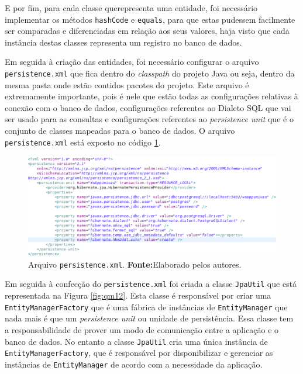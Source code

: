 		\par E por fim, para cada classe querepresenta uma 	entidade, foi necessário
	implementar os métodos \texttt{hashCode} e \texttt{equals}, para que estas
	pudessem facilmente ser comparadas e diferenciadas em relação aos seus
	valores, haja visto que cada instância destas classes representa um registro
	no banco de dados.
		
		\par Em seguida à criação das entidades, foi necessário configurar o arquivo
	\texttt{persistence.xml} que fica dentro do \textit{classpath} do projeto
	Java ou seja, dentro da mesma pasta onde estão contidos pacotes do
	projeto. Este arquivo é extremamente importante, pois é nele que estão todas
	as configurações relativas à conexão com o banco de dados, configurações
	referentes ao Dialeto SQL que vai ser usado para as consultas e configurações
	referentes ao \textit{persistence unit} que é o conjunto de classes mapeadas
	para o banco de dados.	O arquivo \texttt{persistence.xml} está exposto no
	código \ref{fig:qm11}.
	
 		\begin{figure}[h!]
			\centerline{\includegraphics[scale=0.6]{./imagens/2_q_metodologico/qm11.png}}
			\caption[Arquivo \texttt{persistence.xml}]{Arquivo \texttt{persistence.xml}.
			\textbf{Fonte:}Elaborado pelos autores.}
			\label{fig:qm11}
		\end{figure}
		
			\par Em seguida à confecção do \texttt{persistence.xml} foi criada a
		classe \texttt{JpaUtil} que está representada na Figura \ref{fig:qm12}.
		Esta classe é responsável por criar uma \texttt{EntityManagerFactory} que é
		uma  fábrica de instâncias de \texttt{EntityManager} que nada mais é que um
		\textit{persistence unit} ou unidade de persistência. Essa classe tem a
		responsabilidade de prover um modo de comunicação entre a aplicação e o banco
		de dados. No entanto a classe \texttt{JpaUtil} cria uma única instância de
		\texttt{EntityManagerFactory}, que é responsável por disponibilizar e
		gerenciar as instâncias de \texttt{EntityManager} de acordo com a necessidade
		da aplicação.
		
